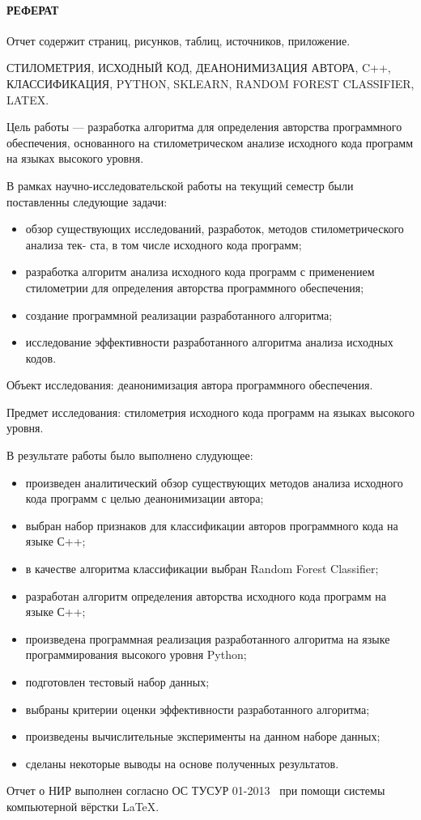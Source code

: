 \newpage
\paragraph{\hfill РЕФЕРАТ \hfill}
Отчет содержит  страниц,  рисунков,  таблиц,  источников,  приложение.

СТИЛОМЕТРИЯ, ИСХОДНЫЙ КОД, ДЕАНОНИМИЗАЦИЯ АВТОРА, C++, КЛАССИФИКАЦИЯ, PYTHON, SKLEARN, RANDOM FOREST CLASSIFIER, LATEX.

Цель работы --- разработка алгоритма для определения авторства программного обеспечения, основанного на стилометрическом анализе исходного кода программ на языках высокого уровня.

В рамках научно-исследовательской работы на текущий семестр были поставленны следующие задачи: 
\begin{itemize}
  \item обзор существующих исследований, разработок, методов стилометрического анализа тек-
ста, в том числе исходного кода программ;
  \item разработка алгоритм анализа исходного кода программ с применением стилометрии для
определения авторства программного обеспечения;
  \item создание программной реализации разработанного алгоритма;
  \item исследование эффективности разработанного алгоритма анализа исходных кодов.
\end{itemize}

Объект исследования: деанонимизация автора программного обеспечения. 

Предмет исследования: стилометрия исходного кода программ на языках высокого уровня.

В результате работы было выполнено слудующее:

\begin{itemize}
  \item произведен аналитический обзор существующих методов анализа исходного кода программ с целью деанонимизации автора;
  \item выбран набор признаков для классификации авторов программного кода на языке С++; 
  \item в качестве алгоритма классификации выбран Random Forest Classifier;
  \item разработан алгоритм определения авторства исходного кода программ на языке С++;
  \item произведена программная реализация разработанного алгоритма на языке программирования высокого уровня Python;
  \item подготовлен тестовый набор данных;
  \item выбраны критерии оценки эффективности разработанного алгоритма;
  \item произведены вычислительные эксперименты на данном наборе данных;
  \item сделаны некоторые выводы на основе полученных результатов.
\end{itemize}

Отчет о НИР выполнен согласно ОС ТУСУР 01-2013~\cite{ostusur} при помощи системы компьютерной вёрстки \LaTeX. 
